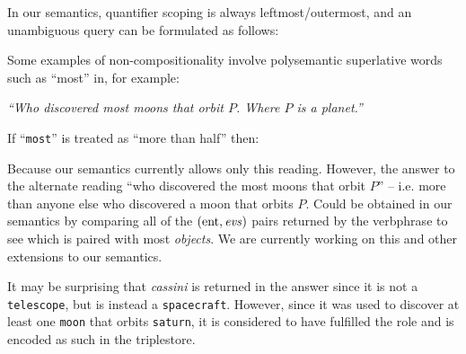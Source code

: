 \documentclass[../main.tex]{subfiles}
\begin{document}
\begin{refsection}

\examplespacing

\noindent In our semantics, quantifier scoping is always leftmost/outermost, and an unambiguous query can be formulated as follows:

\examplespacing


\examplespacing

\noindent Some examples of non-compositionality involve polysemantic superlative words such as ``most'' in, for example:
\begin{center}
	\textit{``Who discovered most moons that orbit $P$. Where $P$ is a planet.''}
\end{center}
If ``\texttt{most}'' is treated as ``more than half'' then:

\examplespacing


\examplespacing

\noindent Because our semantics currently allows only this reading. However, the answer to the alternate reading ``who discovered the most moons that orbit $P$'' – i.e. more than anyone else who discovered a moon that orbits $P$. Could be obtained in our semantics by comparing all of the $(\operatorname{ent}, \operatorname{\mathit{evs}})$ pairs returned by the verbphrase to see which  is paired with most \textit{objects}. We are currently working on this and other extensions to our semantics. %

\examplespacing


\examplespacing

\noindent It may be surprising that \textit{cassini} is returned in the answer since it is not a \texttt{telescope}, but is instead a \texttt{spacecraft}.  However, since it was used to discover at least one \texttt{moon} that orbits \texttt{saturn}, it is considered to have fulfilled the  role and is encoded as such in the triplestore.


\end{refsection}
\end{document}
